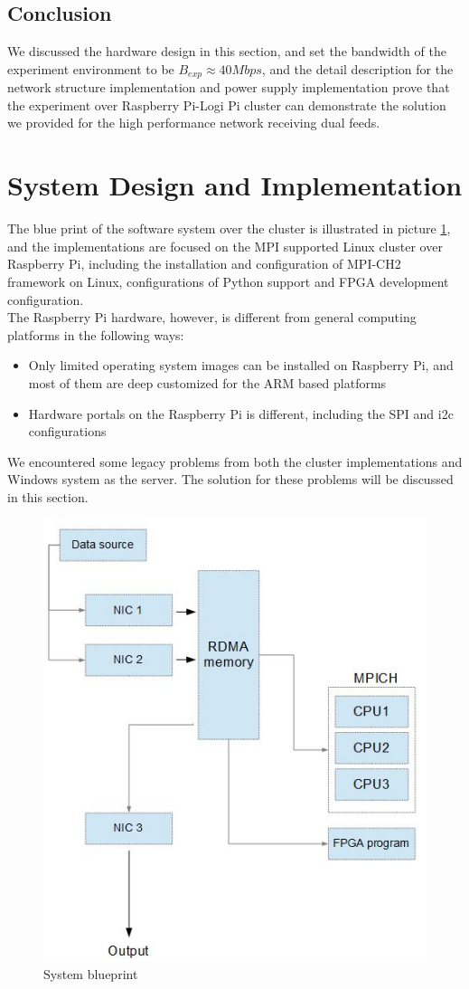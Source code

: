 \documentclass[11pt,openright,a4paper]{report}
\begin{document}
\subsection{Conclusion}
We discussed the hardware design in this section, and set the bandwidth of the experiment environment to be $B_{exp} \approx 40Mbps$, and the detail description for the network structure implementation and power supply implementation prove that the experiment over Raspberry Pi-Logi Pi cluster can demonstrate the solution we provided for the high performance network receiving dual feeds.\\ 
\section{System Design and Implementation}
The blue print of the software system over the cluster is illustrated in picture \ref{fig:LogicDesign}, and the implementations are focused on the MPI supported Linux cluster over Raspberry Pi, including the installation and configuration of MPI-CH2 framework on Linux, configurations of Python support and FPGA development configuration.\\
The Raspberry Pi hardware, however, is different from general computing platforms in the following ways:
\begin{itemize}
	\item Only limited operating system images can be installed on Raspberry Pi, and most of them are deep customized for the ARM based platforms
	\item Hardware portals on the Raspberry Pi is different, including the SPI and i2c configurations
\end{itemize}
We encountered some legacy problems from both the cluster implementations and Windows system as the server. The solution for these problems will be discussed in this section.\\
\begin{figure}[H]
	\centering
	\includegraphics[width=0.5\linewidth]{picture/LogicDesign}
	\caption{System blueprint}
	\label{fig:LogicDesign}
\end{figure}
\end{document}
